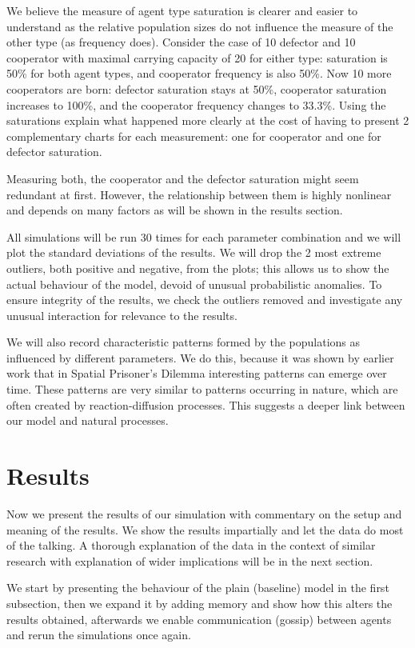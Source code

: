 \documentclass[english]{article}
\begin{document}
We believe the measure of agent type saturation is clearer and easier to understand
as the relative population sizes do not influence the measure of the other type (as frequency does).
Consider the case of 10 defector and 10 cooperator with maximal carrying capacity of 20 for either type:
saturation is 50\% for both agent types, and cooperator frequency is also 50\%.
Now 10 more cooperators are born:
defector saturation stays at 50\%, cooperator saturation increases to 100\%,
and the cooperator frequency changes to 33.3\%.
Using the saturations explain what happened more clearly at the cost of having to present 2 complementary charts for each measurement:
one for cooperator and one for defector saturation.

Measuring both, the cooperator and the defector saturation might seem redundant at first.
However, the relationship between them is highly nonlinear and depends on many factors
as will be shown in the results section.

All simulations will be run 30 times for each parameter combination and we will plot the standard deviations of the results.
We will drop the 2 most extreme outliers, both positive and negative, from the plots; this allows us to show the actual behaviour of the model, devoid of unusual probabilistic anomalies.
To ensure integrity of the results, we check the outliers removed and investigate any unusual interaction for relevance to the results.

We will also record characteristic patterns formed by the populations as influenced by different parameters.
We do this, because it was shown by earlier work \citep{spatial-patterns} that in Spatial Prisoner's Dilemma interesting patterns can emerge over time.
These patterns are very similar to patterns occurring in nature, which are often created by reaction-diffusion processes.
This suggests a deeper link between our model and natural processes.



\section{Results}
Now we present the results of our simulation
with commentary on the setup and meaning of the results.
We show the results impartially and let the data do most of the talking.
A thorough explanation of the data in the context of similar research
with explanation of wider implications will be in the next section.

We start by presenting the behaviour of the plain (baseline) model in the first subsection,
then we expand it by adding memory and show how this alters the results obtained,
afterwards we enable communication (gossip) between agents and rerun the simulations once again.
\end{document}
